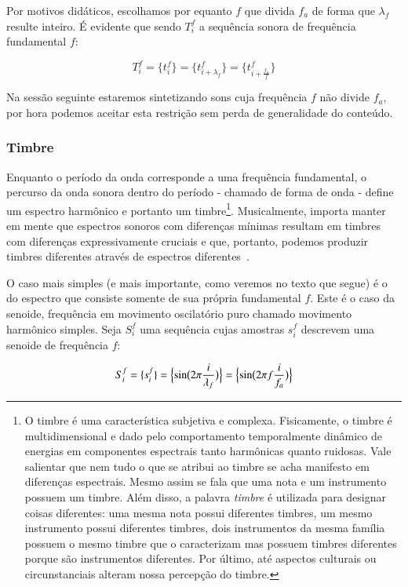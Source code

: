 Por motivos didáticos, escolhamos por equanto $f$ que divida $f_a$ de forma que $\lambda_f$ resulte inteiro.
É evidente que sendo $T_i^f$ a sequência sonora de frequência fundamental $f$:
    
\begin{equation}\label{periodicidade}
     T^f_i=\{ t_i^f \}=\{ t^f_{i+\lambda_{f}}  \}= \{ t^f_{i+\frac{f_a}{f}} \}
\end{equation}

Na sessão seguinte estaremos sintetizando sons cuja frequência $f$ não divide $f_a$, por hora podemos aceitar esta restrição sem perda de generalidade do conteúdo.

\subsubsection{Timbre}
Enquanto o período da onda corresponde a uma frequência fundamental, o percurso
da onda sonora dentro do período - chamado de forma de onda - define um espectro harmônico e portanto
um timbre\footnote{O timbre é uma característica subjetiva e complexa. Fisicamente,
o timbre é multidimensional e dado pelo comportamento temporalmente dinâmico
de energias em componentes espectrais tanto harmônicas quanto ruidosas.  Vale salientar que nem tudo
o que se atribui ao timbre se acha manifesto em diferenças espectrais. Mesmo
assim se fala que uma nota e um instrumento possuem um timbre.
Além disso, a palavra \emph{timbre} é utilizada para designar coisas diferentes: uma mesma nota
possui diferentes timbres, um mesmo instrumento possui diferentes timbres, dois instrumentos da mesma família possuem o mesmo timbre que o caracterizam mas possuem timbres diferentes porque são instrumentos diferentes.  Por último, até
aspectos culturais ou circunstanciais alteram nossa percepção do timbre.
}. Musicalmente, importa manter em mente que espectros sonoros com diferenças mínimas resultam em timbres com diferenças expressivamente cruciais e que, portanto, podemos produzir timbres diferentes através de espectros diferentes~\cite{Roederer}.


O caso mais simples (e mais importante, como veremos no texto que segue) é o do espectro que consiste somente
de sua própria fundamental $f$. Este é o caso da senoide, frequência em movimento oscilatório puro chamado
movimento harmônico simples. Seja $S_i^f$ uma sequência cujas amostras
$s_i^f$ descrevem uma senoide de frequência $f$:

\begin{equation}\label{senoide}
     S^f_i=\{ s^f_i \}=\Bigl\{ \sin\bigl(2\pi \frac{i}{\lambda_f} \bigr)  \Bigr\} = \Bigl\{ \sin\bigl(2\pi f \frac{i}{f_a}\bigr)  \Bigr\} 
\end{equation}

